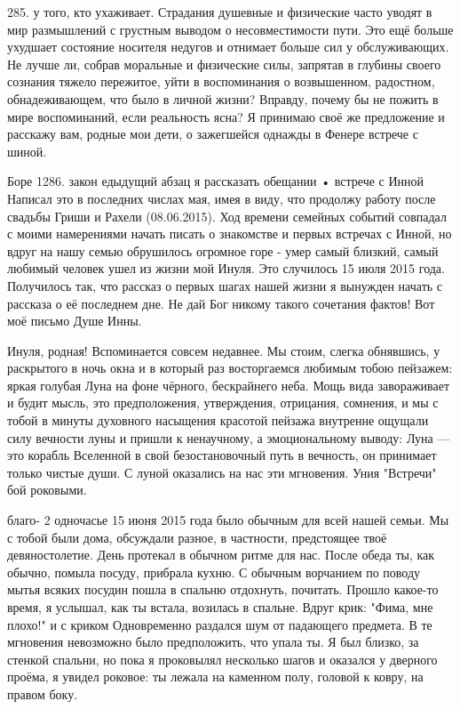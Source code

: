 285. у того, кто ухаживает. Страдания душевные и физические часто уводят в мир размышлений с грустным выводом о несовместимости пути. Это ещё больше ухудшает состояние носителя недугов и отнимает больше сил у обслуживающих. Не лучше ли, собрав моральные и физические силы, запрятав в глубины своего сознания тяжело пережитое, уйти в воспоминания о возвышенном, радостном, обнадеживающем, что было в личной жизни? Вправду, почему бы не пожить в мире воспоминаний, если реальность ясна? Я принимаю своё же предложение и расскажу вам, родные мои дети, о зажегшейся однажды в Фенере встрече с шиной.

Боре 1286. закон едыдущий абзац я рассказать обещании • встрече с Инной Написал это в последних числах мая, имея в виду, что продолжу работу после свадьбы Гриши и Рахели (08.06.2015). Ход времени семейных событий совпадал с моими намерениями начать писать о знакомстве и первых встречах с Инной, но вдруг на нашу семью обрушилось огромное горе - умер самый близкий, самый любимый человек ушел из жизни мой Инуля. Это случилось 15 июля 2015 года. Получилось так, что рассказ о первых шагах нашей жизни я вынужден начать с рассказа о её последнем дне. Не дай Бог никому такого сочетания фактов! Вот моё письмо Душе Инны.

Инуля, родная!
Вспоминается совсем недавнее. Мы стоим, слегка обнявшись, у раскрытого в ночь окна и в который раз восторгаемся любимым тобою пейзажем: яркая голубая Луна на фоне чёрного, бескрайнего неба. Мощь вида завораживает и будит мысль, это предположения, утверждения, отрицания, сомнения, и мы с тобой в минуты духовного насыщения красотой пейзажа внутренне ощущали силу вечности луны и пришли к ненаучному, а эмоциональному выводу: Луна — это корабль Вселенной в свой безостановочный путь в вечность, он принимает только чистые души.
С луной оказались на нас эти мгновения. Уния "Встречи" бой роковыми.

благо- 2 одночасье 15 июня 2015 года было обычным для всей нашей семьи. Мы с тобой были дома, обсуждали разное, в частности, предстоящее твоё девяностолетие. День протекал в обычном ритме для нас. После обеда ты, как обычно, помыла посуду, прибрала кухню. С обычным ворчанием по поводу мытья всяких посудин пошла в спальню отдохнуть, почитать. Прошло какое-то время, я услышал, как ты встала, возилась в спальне. Вдруг крик: "Фима, мне плохо!" и с криком Одновременно раздался шум от падающего предмета. В те мгновения невозможно было предположить, что упала ты. Я был близко, за стенкой спальни, но пока я проковылял несколько шагов и оказался у дверного проёма, я увидел роковое: ты лежала на каменном полу, головой к ковру, на правом боку.


